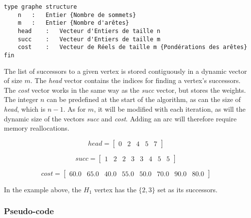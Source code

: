 \begin{lstlisting}[language=pseudo, caption={Définition de la structure graphe}, label=struct_graphe]
type graphe structure
	n	:	Entier {Nombre de sommets}
	m	:	Entier {Nombre d'arêtes}
	head	:	Vecteur d'Entiers de taille n
	succ	:	Vecteur d'Entiers de taille m
	cost	:	Vecteur de Réels de taille m {Pondérations des arêtes}
fin
\end{lstlisting}

The list of successors to a given vertex is stored contiguously in a dynamic vector of size $m$. The \textit{head} vector contains the indices for finding a vertex's successors. The \textit{cost} vector works in the same way as the \textit{succ} vector, but stores the weights. The integer $n$ can be predefined at the start of the algorithm, as can the size of \textit{head}, which is $n-1$. As for $m$, it will be modified with each iteration, as will the dynamic size of the vectors \textit{succ} and \textit{cost}. Adding an arc will therefore require memory reallocations.

\begin{displaymath}
head = \begin{bmatrix}
0 & 2 & 4 & 5 & 7
\end{bmatrix}
\end{displaymath}

\begin{displaymath}
succ = \begin{bmatrix}
1 & 2 & 2 & 3 & 3 & 4 & 5 & 5
\end{bmatrix}
\end{displaymath}

\begin{displaymath}
cost = \begin{bmatrix}
60.0 & 65.0 & 40.0 & 55.0 & 50.0 & 70.0 & 90.0 & 80.0
\end{bmatrix}
\end{displaymath}

In the example above, the $H_1$ vertex has the $\{2, 3 \}$ set as its successors.

\subsubsection{Pseudo-code}

